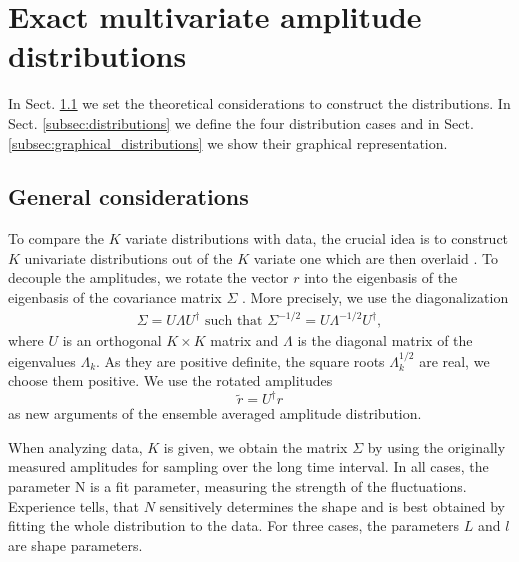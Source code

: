 \section{Exact multivariate amplitude distributions}
\label{sec:exact_distributions}


In Sect. \ref{subsec:general_considerations} we set the theoretical
considerations to construct the distributions. In Sect.
\ref{subsec:distributions} we define the four distribution cases and in Sect.
\ref{subsec:graphical_distributions} we show their graphical representation.

\subsection{General considerations}\label{subsec:general_considerations}

To compare the $K$ variate distributions with data, the crucial idea is to
construct $K$ univariate distributions out of the $K$ variate one which are
then overlaid \cite{exact_distributions_guhr}. To decouple the amplitudes, we
rotate the vector $r$ into the eigenbasis of the eigenbasis of the covariance
matrix $\Sigma$ \cite{non_stationarity_fin_guhr,exact_distributions_guhr}. More
precisely, we use the diagonalization
\begin{align}
    \Sigma = U \Lambda U^{\dagger} \text{ such that }
    \Sigma^{-1/2} = U \Lambda^{-1/2} U^{\dagger},
\end{align}
where $U$ is an orthogonal $K \times K$ matrix and $\Lambda$ is the diagonal
matrix of the eigenvalues $\Lambda_{k}$. As they are positive definite, the
square roots $\Lambda_{k}^{1/2}$ are real, we choose them positive. We use the
rotated amplitudes
\begin{equation}
    \tilde{r} = U^{\dagger} r
\end{equation}
as new arguments of the ensemble averaged amplitude distribution.

When analyzing data, $K$ is given, we obtain the matrix $\Sigma$ by using the
originally measured amplitudes for sampling over the long time interval. In all
cases, the parameter N is a fit parameter, measuring the strength of the
fluctuations. Experience tells, that $N$ sensitively determines the shape and
is best obtained by fitting the whole distribution to the data. For three
cases, the parameters $L$ and $l$ are shape parameters.

